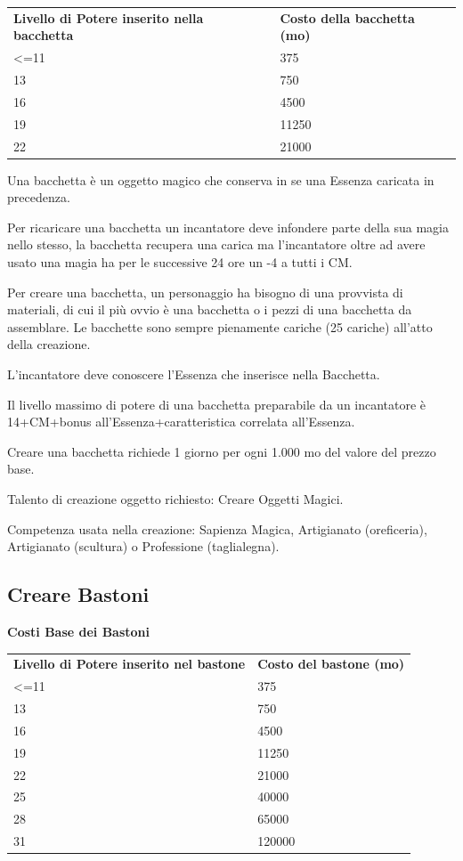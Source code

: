 \documentclass[a4paper,11pt,twoside,openany]{book}
\begin{document}
{\begin{tabular}{ll}
\toprule
\textbf{Livello di Potere inserito nella bacchetta} & \textbf{Costo della bacchetta (mo)}\tabularnewline
\textless=11 & 375\tabularnewline
13 & 750\tabularnewline
16 & 4500\tabularnewline
19 & 11250\tabularnewline
22 & 21000\tabularnewline
\end{tabular}

\bigskip

Una bacchetta è un oggetto magico che conserva in se una Essenza caricata in precedenza.

Per ricaricare una bacchetta un incantatore deve infondere parte della sua magia nello stesso, la bacchetta recupera una carica ma l'incantatore oltre ad avere usato una magia ha per le successive 24 ore un -4 a tutti i CM.

Per creare una bacchetta, un personaggio ha bisogno di una provvista di materiali, di cui il più ovvio è una bacchetta o i pezzi di una bacchetta da assemblare. Le bacchette sono sempre pienamente cariche (25 cariche) all'atto della creazione.

L'incantatore deve conoscere l'Essenza che inserisce nella Bacchetta.

Il livello massimo di potere di una bacchetta preparabile da un incantatore è 14+CM+bonus all'Essenza+caratteristica correlata all'Essenza.

Creare una bacchetta richiede 1 giorno per ogni 1.000 mo del valore del prezzo base.

Talento di creazione oggetto richiesto: Creare Oggetti Magici.

Competenza usata nella creazione: Sapienza Magica, Artigianato (oreficeria),
Artigianato (scultura) o Professione (taglialegna).

\subsection{Creare Bastoni}

\textbf{Costi Base dei Bastoni}

\bigskip

\begin{tabular}{ll}
\toprule
\textbf{Livello di Potere inserito nel bastone} & \textbf{Costo del bastone (mo)}\tabularnewline
\textless=11 & 375\tabularnewline
13 & 750\tabularnewline
16 & 4500\tabularnewline
19 & 11250\tabularnewline
22 & 21000\tabularnewline
25 & 40000\tabularnewline
28 & 65000\tabularnewline
31 & 120000\tabularnewline
\end{tabular}

}
\end{document}
